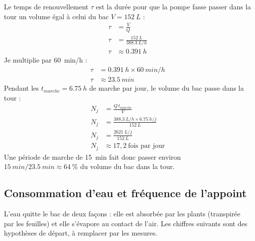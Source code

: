 \begin{demonstration}
Le temps de renouvellement $\tau$ est la durée pour que la pompe fasse passer dans la tour un volume égal à celui du bac $V = \qty{152}{L}$ :
\begin{align*}
\tau &= \frac{V}{Q}\\
\tau &= \frac{\qty{152}{L}}{\qty{388,3}{L/h}}\\
\tau &\approx \qty{0,391}{h}
\end{align*}
Je multiplie par \qty{60}{min/h} :
\begin{align*}
\tau &= \qty{0,391}{h}\times\qty{60}{min/h}\\
\tau &\approx \qty{23,5}{min}
\end{align*}
Pendant les $t_{marche} = \qty{6,75}{h}$ de marche par jour, le volume du bac passe dans la tour :
\begin{align*}
N_j &= \frac{Q\,t_{marche}}{V}\\
N_j &= \frac{\qty{388,3}{L/h}\times\qty{6,75}{h/j}}{\qty{152}{L}}\\
N_j &= \frac{\qty{2621}{L/j}}{\qty{152}{L}}\\
N_j &\approx 17{,}2\ \text{fois par jour}
\end{align*}
Une période de marche de \qty{15}{min} fait donc passer environ $\qty{15}{min}/\qty{23,5}{min} \approx 64\ \%$ du volume du bac dans la tour.
\end{demonstration}

\subsection{Consommation d'eau et fréquence de l'appoint}

L'eau quitte le bac de deux façons : elle est absorbée par les plants (transpirée par les feuilles) et elle s'évapore au contact de l'air. Les chiffres suivants sont des hypothèses de départ, à remplacer par les mesures.


